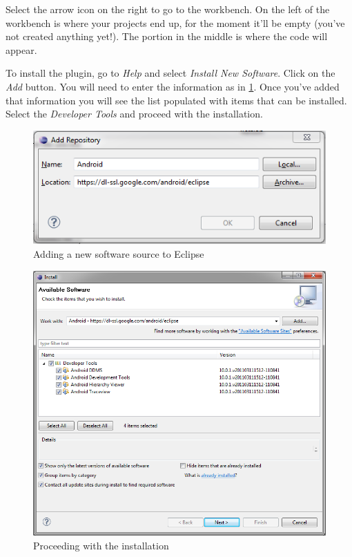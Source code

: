 Select the arrow icon on the right to go to the workbench. On the left of the workbench is where your projects end up, for the moment it'll be empty (you've not created anything yet!). The portion in the middle is where the code will appear.

To install the plugin, go to \textit{Help} and select \textit{Install New Software}. Click on the \textit{Add} button. You will need to enter the information as in \ref{fig:new_software}. Once you've added that information you will see the list populated with items that can be installed. Select the \textit{Developer Tools} and proceed with the installation.

\begin{figure}[!ht]
  \includegraphics[width=\textwidth]{./images/new_software.png}%
  \caption{Adding a new software source to Eclipse}
  \label{fig:new_software}
\end{figure}

\begin{figure}[!ht]
  \includegraphics[width=\textwidth]{./images/adt_plugin.png}%
  \caption{Proceeding with the installation}
  \label{fig:adt_plugin}
\end{figure}

